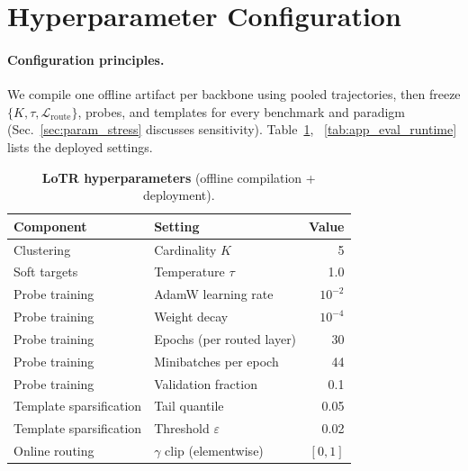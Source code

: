 \section{Hyperparameter Configuration}
\label{app:hyper}

\paragraph{Configuration principles.}
We compile one offline artifact per backbone using pooled trajectories, then freeze \(\{K,\tau,\mathcal{L}_{\mathrm{route}}\}\), probes, and templates for every benchmark and paradigm (Sec.~\ref{sec:param_stress} discusses sensitivity).
Table~\ref{tab:app_hyper_lotr}, ~\ref{tab:app_eval_runtime} lists the deployed settings.

\begin{table}[t]
\centering
\caption{\textbf{LoTR hyperparameters} (offline compilation + deployment).}
\label{tab:app_hyper_lotr}
\footnotesize
\setlength{\tabcolsep}{6pt}
\renewcommand{\arraystretch}{1.08}
\begin{tabular}{@{}llr@{}}
\toprule
\textbf{Component} & \textbf{Setting} & \textbf{Value} \\
\midrule
Clustering & Cardinality \(K\) & 5 \\
Soft targets & Temperature \(\tau\) & 1.0 \\
Probe training & AdamW learning rate & \(10^{-2}\) \\
Probe training & Weight decay & \(10^{-4}\) \\
Probe training & Epochs (per routed layer) & 30 \\
Probe training & Minibatches per epoch & 44 \\
Probe training & Validation fraction & 0.1 \\
Template sparsification & Tail quantile & 0.05 \\
Template sparsification & Threshold \(\varepsilon\) & 0.02 \\
Online routing & \(\gamma\) clip (elementwise) & \([0,1]\) \\
\bottomrule
\end{tabular}
\end{table}

